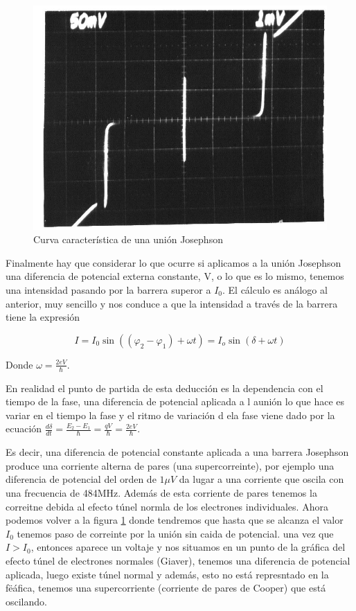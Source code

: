 \begin{figure}[H]
\centering \includegraphics[width=0.8\linewidth]{img/IVJJ.JPG}
\caption{Curva característica de una unión Josephson}
\label{fig:ivjj}
\end{figure}

Finalmente hay que considerar lo que ocurre si aplicamos a la unión Josephson una diferencia de potencial externa constante, V, o lo que es lo mismo, tenemos una intensidad pasando por la barrera superor a $I_0$. El cálculo es análogo al anterior, muy sencillo y nos conduce a que la intensidad a través de la barrera tiene la expresión

\begin{equation}
    I = I_0 \sin( (\varphi_2 - \varphi_1) + \omega t) = I_o \sin(\delta + \omega t)
\end{equation}

Donde $\omega = \frac{2 eV}{\hbar}$.

En realidad el punto de partida de esta deducción es la dependencia con el tiempo de la fase, una diferencia de potencial aplicada a l aunión lo que hace es variar en el tiempo la fase y el ritmo de variación d ela fase viene dado por la ecuación $\frac{d \delta}{d t} = \frac{E_2 - E_1}{\hbar} = \frac{qV}{\hbar} = \frac{2 eV}{\hbar}$.

Es decir, una diferencia de potencial constante aplicada a una barrera Josephson produce una corriente alterna de pares (una supercorreinte), por ejemplo una diferencia de potencial del orden de $1 \mu V$ da lugar a una corriente que oscila con una frecuencia de 484MHz. Además de esta corriente de pares tenemos la correitne debida al efecto túnel normla de los electrones individuales. Ahora podemos volver a la figura \ref{fig:ivjj} donde tendremos que hasta que se alcanza el valor $I_0$ tenemos paso de correinte por la unión sin caida de potencial. una vez que $I > I_0$, entonces aparece un voltaje y nos situamos en un punto de la gráfica del efecto túnel de electrones normales (Giaver), tenemos una diferencia de potencial aplicada, luego existe túnel normal y además, esto no está represntado en la fëáfica, tenemos una supercorriente (corriente de pares de Cooper) que está oscilando.

